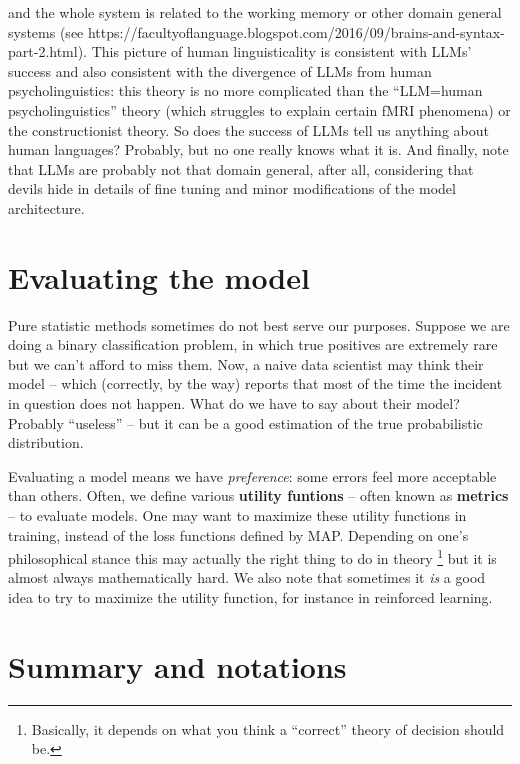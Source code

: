 \documentclass[hyperref, a4paper, 12pt]{report}
\newcommand*{\concept}[1]{{\textbf{#1}}}
\begin{document}
and the whole system is related to the working memory or other domain general systems (see https://facultyoflanguage.blogspot.com/2016/09/brains-and-syntax-part-2.html).
This picture of human linguisticality is consistent with LLMs' success
and also consistent with the divergence of LLMs from human psycholinguistics:
this theory is no more complicated than the ``LLM=human psycholinguistics'' theory (which struggles to explain certain fMRI phenomena) or the constructionist theory.
So does the success of LLMs tell us anything about human languages?
Probably, but no one really knows what it is.
And finally, note that LLMs are probably not that domain general, after all,
considering that devils hide in details of fine tuning and minor modifications of the model architecture.

\section{Evaluating the model}

Pure statistic methods sometimes do not best serve our purposes.
Suppose we are doing a binary classification problem,
in which true positives are extremely rare
but we can't afford to miss them.
Now, a naive data scientist may think their model --
which (correctly, by the way) reports that most of the time the incident in question does not happen.
What do we have to say about their model?
Probably ``useless'' -- but it can be a good estimation of the true probabilistic distribution.

Evaluating a model means we have \emph{preference}:
some errors feel more acceptable than others.
Often, we define various \concept{utility funtions} -- often known as \concept{metrics} -- to evaluate models.
One may want to maximize these utility functions in training,
instead of the loss functions defined by MAP.
Depending on one's philosophical stance this may actually the right thing to do in theory%
\footnote{
    Basically, it depends on what you think a ``correct'' theory of decision should be.
}
but it is almost always mathematically hard.
We also note that sometimes it \emph{is} a good idea to try to maximize the utility function,
for instance in reinforced learning.

\section{Summary and notations}
\end{document}
